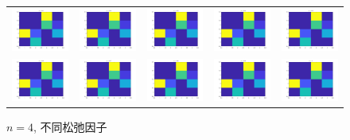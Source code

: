 \documentclass[UTF8,10.5pt,a4paper]{ctexart}
\theoremstyle{definition}
\theoremstyle{definition}
\begin{document}
\begin{figure}[htbp]
	\renewcommand{\captionfont}{\small}
	\centering
	\begin{tabular}{@{}ccccc@{}}
		\includegraphics[width=.18\textwidth]{alpha1n4.jpg} & 
		\includegraphics[width=.18\textwidth]{alpha2n4.jpg} & 
		\includegraphics[width=.18\textwidth]{alpha3n4.jpg} & 
		\includegraphics[width=.18\textwidth]{alpha4n4.jpg} & 
		\includegraphics[width=.18\textwidth]{alpha5n4.jpg}\\
		\includegraphics[width=.18\textwidth]{alpha6n4.jpg} & 
		\includegraphics[width=.18\textwidth]{alpha7n4.jpg} &
		\includegraphics[width=.18\textwidth]{alpha8n4.jpg} & 
		\includegraphics[width=.18\textwidth]{alpha9n4.jpg} & 
		\includegraphics[width=.18\textwidth]{alpha10n4.jpg}
	\end{tabular}
	\caption{$n=4$, 不同松弛因子}
	\label{alphan4figure}
\end{figure}
\end{document}
